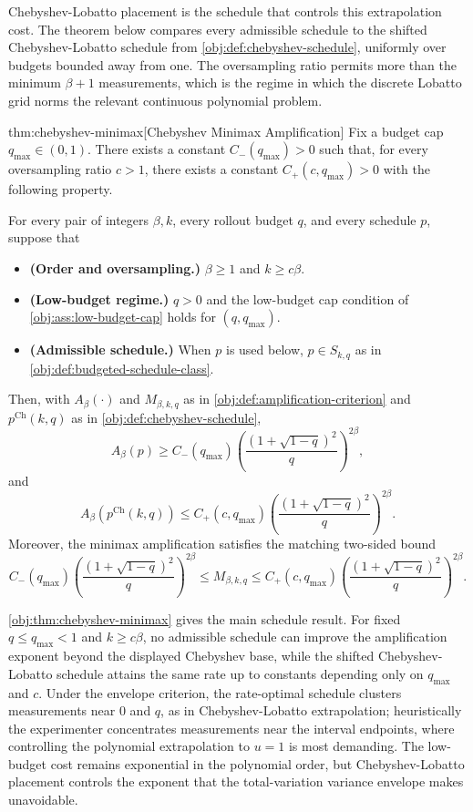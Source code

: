 Chebyshev-Lobatto placement is the schedule that controls this extrapolation cost. The theorem below compares every admissible schedule to the shifted Chebyshev-Lobatto schedule from \cref{obj:def:chebyshev-schedule}, uniformly over budgets bounded away from one. The oversampling ratio  permits more than the minimum \(\beta+1\) measurements, which is the regime in which the discrete Lobatto grid norms the relevant continuous polynomial problem.

\begin{theoremv}{thm:chebyshev-minimax}[Chebyshev Minimax Amplification]
Fix a budget cap \(q_{\max}\in(0,1)\). There exists a constant
\(C_-(q_{\max})>0\) such that, for every oversampling ratio \(c>1\), there
exists a constant \(C_+(c,q_{\max})>0\) with the following property.

For every pair of integers \(\beta,k\), every rollout budget \(q\), and every
schedule \(p\), suppose that
\begin{itemize}
\item \textbf{(Order and oversampling.)} \(\beta\ge 1\) and \(k\ge c\beta\).
\item \textbf{(Low-budget regime.)} \(q>0\) and the low-budget cap condition of
\cref{obj:ass:low-budget-cap} holds for \((q,q_{\max})\).
\item \textbf{(Admissible schedule.)} When \(p\) is used below, \(p\in S_{k,q}\)
as in \cref{obj:def:budgeted-schedule-class}.
\end{itemize}
Then, with \(A_\beta(\cdot)\) and \(M_{\beta,k,q}\) as in
\cref{obj:def:amplification-criterion} and
\(p^{\mathrm{Ch}}(k,q)\) as in \cref{obj:def:chebyshev-schedule},
\[
A_\beta(p)
\ge
C_-(q_{\max})
\left(\frac{(1+\sqrt{1-q})^2}{q}\right)^{2\beta},
\]
and
\[
A_\beta\!\left(p^{\mathrm{Ch}}(k,q)\right)
\le
C_+(c,q_{\max})
\left(\frac{(1+\sqrt{1-q})^2}{q}\right)^{2\beta}.
\]
Moreover, the minimax amplification satisfies the matching two-sided bound
\[
C_-(q_{\max})
\left(\frac{(1+\sqrt{1-q})^2}{q}\right)^{2\beta}
\le
M_{\beta,k,q}
\le
C_+(c,q_{\max})
\left(\frac{(1+\sqrt{1-q})^2}{q}\right)^{2\beta}.
\]
\end{theoremv}

\cref{obj:thm:chebyshev-minimax} gives the main schedule result. For fixed \(q\le q_{\max}<1\) and \(k\ge c\beta\), no admissible schedule can improve the amplification exponent beyond the displayed Chebyshev base, while the shifted Chebyshev-Lobatto schedule attains the same rate up to constants depending only on \(q_{\max}\) and \(c\). Under the envelope criterion, the rate-optimal schedule clusters measurements near \(0\) and \(q\), as in Chebyshev-Lobatto extrapolation; heuristically the experimenter concentrates measurements near the interval endpoints, where controlling the polynomial extrapolation to \(u=1\) is most demanding. The low-budget cost remains exponential in the polynomial order, but Chebyshev-Lobatto placement controls the exponent that the total-variation variance envelope makes unavoidable.

